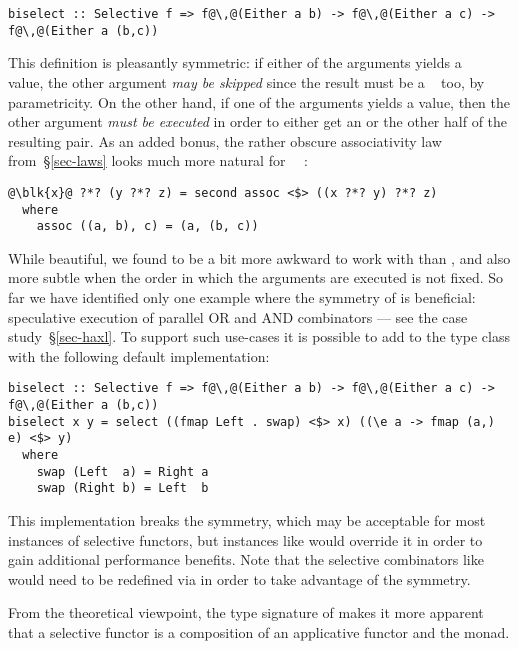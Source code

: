 \vspace{1mm}
\begin{verbatim}
biselect :: Selective f => f@\,@(Either a b) -> f@\,@(Either a c) -> f@\,@(Either a (b,c))
\end{verbatim}
\vspace{1mm}

\noindent
This definition is pleasantly symmetric: if either of the arguments yields a
~ value, the other argument \emph{may be skipped} since the
result must be a ~ too, by parametricity. On the other hand, if
one of the arguments yields a  value, then the other argument
\emph{must be executed} in order to either get an  or the other half of
the resulting pair. As an added bonus, the rather obscure associativity law
from~\S\ref{sec-laws} looks much more natural for
~\hs{=}~:

\vspace{1mm}
\begin{verbatim}
@\blk{x}@ ?*? (y ?*? z) = second assoc <$> ((x ?*? y) ?*? z)
  where
    assoc ((a, b), c) = (a, (b, c))
\end{verbatim}
\vspace{1mm}

\noindent
While beautiful, we found  to be a bit more awkward to work with
than , and also more subtle when the order in which the arguments
are executed is not fixed. So far we have identified only one example where the
symmetry of  is beneficial: speculative execution of parallel OR
and AND combinators --- see the \Haxl case study~\S\ref{sec-haxl}. To support
such use-cases it is possible to add  to the  type
class with the following default implementation:

\vspace{1mm}
\begin{verbatim}
biselect :: Selective f => f@\,@(Either a b) -> f@\,@(Either a c) -> f@\,@(Either a (b,c))
biselect x y = select ((fmap Left . swap) <$> x) ((\e a -> fmap (a,) e) <$> y)
  where
    swap (Left  a) = Right a
    swap (Right b) = Left  b
\end{verbatim}
\vspace{1mm}

\noindent
This implementation breaks the symmetry, which may be acceptable for most
instances of selective functors, but instances like  would override it
in order to gain additional performance benefits. Note that the selective
combinators like \hs{<||>} would need to be redefined via  in order
to take advantage of the symmetry.

From the theoretical viewpoint, the type signature of  makes it
more apparent that a selective functor  is a composition of an applicative
functor  and the  monad.


